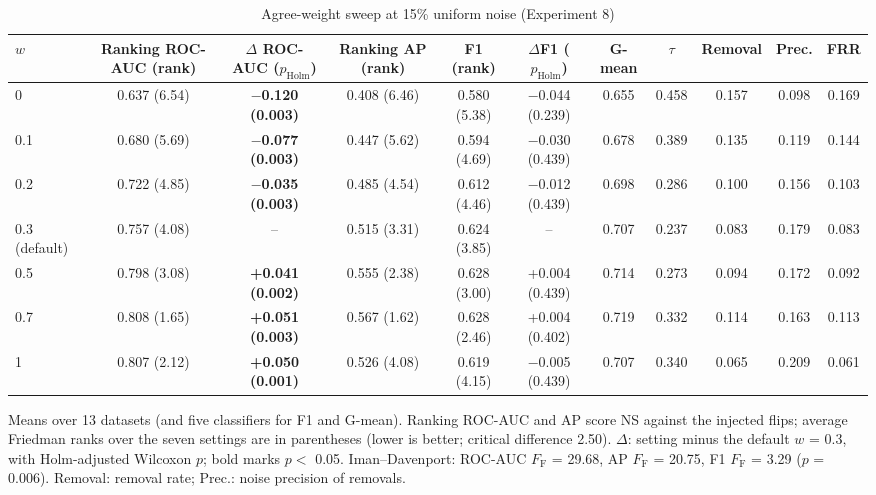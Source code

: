 \documentclass[conference]{IEEEtran}
\begin{document}
\begin{table}[!t]
\centering
\footnotesize
\caption{Agree-weight sweep at 15\% uniform noise (Experiment 8)}
\label{tab:13}
\setlength{\tabcolsep}{3.5pt}
\begin{adjustbox}{max width=\linewidth}
\begin{tabular}{lcccccccccc}
\hline
$w$ & Ranking ROC-AUC (rank) & $\Delta $ ROC-AUC ($p_{\mathrm{Holm}}$) & Ranking AP (rank) & F1 (rank) & $\Delta $F1 ($p_{\mathrm{Holm}}$) & G-mean & $\tau $ & Removal & Prec. & FRR \\
\hline
0 & 0.637 (6.54) & \textbf{$-$0.120 (0.003)} & 0.408 (6.46) & 0.580 (5.38) & $-$0.044 (0.239) & 0.655 & 0.458 & 0.157 & 0.098 & 0.169 \\
0.1 & 0.680 (5.69) & \textbf{$-$0.077 (0.003)} & 0.447 (5.62) & 0.594 (4.69) & $-$0.030 (0.439) & 0.678 & 0.389 & 0.135 & 0.119 & 0.144 \\
0.2 & 0.722 (4.85) & \textbf{$-$0.035 (0.003)} & 0.485 (4.54) & 0.612 (4.46) & $-$0.012 (0.439) & 0.698 & 0.286 & 0.100 & 0.156 & 0.103 \\
0.3 (default) & 0.757 (4.08) & -- & 0.515 (3.31) & 0.624 (3.85) & -- & 0.707 & 0.237 & 0.083 & 0.179 & 0.083 \\
0.5 & 0.798 (3.08) & \textbf{+0.041 (0.002)} & 0.555 (2.38) & 0.628 (3.00) & +0.004 (0.439) & 0.714 & 0.273 & 0.094 & 0.172 & 0.092 \\
0.7 & 0.808 (1.65) & \textbf{+0.051 (0.003)} & 0.567 (1.62) & 0.628 (2.46) & +0.004 (0.402) & 0.719 & 0.332 & 0.114 & 0.163 & 0.113 \\
1 & 0.807 (2.12) & \textbf{+0.050 (0.001)} & 0.526 (4.08) & 0.619 (4.15) & $-$0.005 (0.439) & 0.707 & 0.340 & 0.065 & 0.209 & 0.061 \\
\hline
\end{tabular}
\end{adjustbox}
\par\vspace{3pt}
\begin{minipage}{\linewidth}\scriptsize Means over 13 datasets (and five classifiers for F1 and G-mean). Ranking ROC-AUC and AP score NS against the injected flips; average Friedman ranks over the seven settings are in parentheses (lower is better; critical difference 2.50). $\Delta $: setting minus the default $w$ = 0.3, with Holm-adjusted Wilcoxon $p$; bold marks $p <$ 0.05. Iman--Davenport: ROC-AUC $F_{\mathrm{F}}$ = 29.68, AP $F_{\mathrm{F}}$ = 20.75, F1 $F_{\mathrm{F}}$ = 3.29 ($p$ = 0.006). Removal: removal rate; Prec.: noise precision of removals.\end{minipage}
\end{table}
\end{document}
